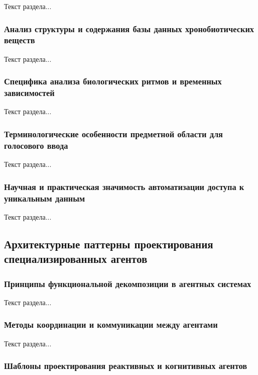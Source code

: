 Текст раздела...

\subsubsection{Анализ структуры и содержания базы данных хронобиотических веществ}

Текст раздела...

\subsubsection{Специфика анализа биологических ритмов и временных зависимостей}

Текст раздела...

\subsubsection{Терминологические особенности предметной области для голосового ввода}

Текст раздела...

\subsubsection{Научная и практическая значимость автоматизации доступа к уникальным данным}

Текст раздела...

\subsection{Архитектурные паттерны проектирования специализированных агентов}

\subsubsection{Принципы функциональной декомпозиции в агентных системах}

Текст раздела...

\subsubsection{Методы координации и коммуникации между агентами}

Текст раздела...

\subsubsection{Шаблоны проектирования реактивных и когнитивных агентов}

